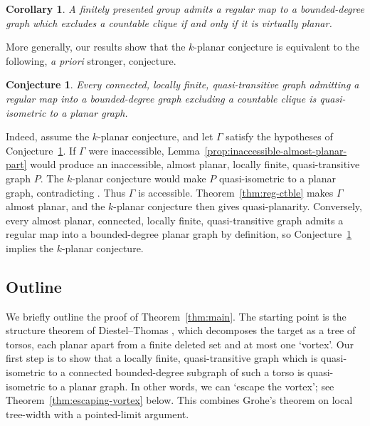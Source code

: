 \documentclass[10pt,a4paper]{amsart}
\newtheorem{alphcor}[alphtheorem]{Corollary}
\newtheorem{conjecture}[theorem]{Conjecture}
\theoremstyle{definition}
\begin{document}
\begin{alphcor}\label{cor:planar-rigidity-regularmaps}
     A finitely presented group admits a regular map to a bounded-degree graph which excludes a countable clique if and only if it is virtually planar. 
\end{alphcor}

More generally, our results show that the $k$-planar conjecture is equivalent to the following, \emph{a priori} stronger, conjecture.

\begin{conjecture}\label{conj:k-planar-strong}
    Every connected, locally finite, quasi-transitive graph admitting a regular map into a bounded-degree graph excluding a countable clique is quasi-isometric to a planar graph.
\end{conjecture}

Indeed, assume the $k$-planar conjecture, and let $\Gamma$ satisfy the hypotheses of Conjecture~\ref{conj:k-planar-strong}. If $\Gamma$ were inaccessible, Lemma~\ref{prop:inaccessible-almost-planar-part} would produce an inaccessible, almost planar, locally finite, quasi-transitive graph $P$. The $k$-planar conjecture would make $P$ quasi-isometric to a planar graph, contradicting \cite[Thm.~A]{macmanus2023accessibility}. Thus $\Gamma$ is accessible. Theorem~\ref{thm:reg-ctble} makes $\Gamma$ almost planar, and the $k$-planar conjecture then gives quasi-planarity. Conversely, every almost planar, connected, locally finite, quasi-transitive graph admits a regular map into a bounded-degree planar graph by definition, so Conjecture~\ref{conj:k-planar-strong} implies the $k$-planar conjecture.


\subsection{Outline}

We briefly outline the proof of Theorem~\ref{thm:main}. The starting point is the structure theorem of Diestel--Thomas \cite{diestel1999excluding}, which decomposes the target as a tree of torsos, each planar apart from a finite deleted set and at most one `vortex'. Our first step is to show that a locally finite, quasi-transitive graph which is quasi-isometric to a connected bounded-degree subgraph of such a torso is quasi-isometric to a planar graph. In other words, we can `escape the vortex'; see Theorem~\ref{thm:escaping-vortex} below. This combines Grohe's theorem on local tree-width \cite{Grohe03} with a pointed-limit argument.
\end{document}

